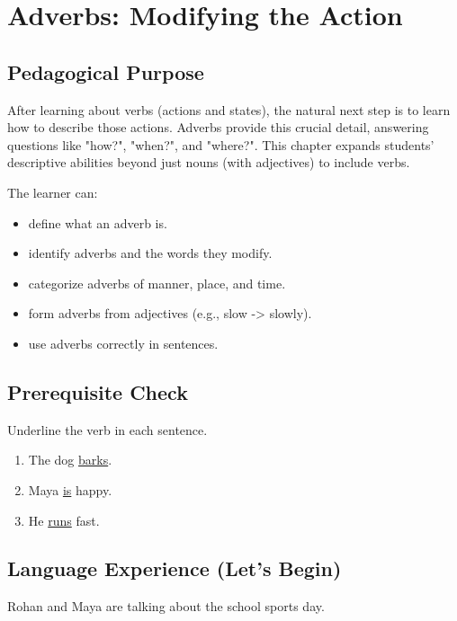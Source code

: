 
\chapter{Adverbs: Modifying the Action}

\section{Pedagogical Purpose}
After learning about verbs (actions and states), the natural next step is to learn how to describe those actions. Adverbs provide this crucial detail, answering questions like "how?", "when?", and "where?". This chapter expands students' descriptive abilities beyond just nouns (with adjectives) to include verbs.

\begin{learningobjectives}
The learner can:
\begin{itemize}
    \item define what an adverb is.
    \item identify adverbs and the words they modify.
    \item categorize adverbs of manner, place, and time.
    \item form adverbs from adjectives (e.g., slow -> slowly).
    \item use adverbs correctly in sentences.
\end{itemize}
\end{learningobjectives}

\section{Prerequisite Check}
\begin{quickcheck}
Underline the verb in each sentence.
\begin{enumerate}
    \item The dog \underline{barks}.
    \item Maya \underline{is} happy.
    \item He \underline{runs} fast.
\end{enumerate}
\end{quickcheck}

\section{Language Experience (Let's Begin)}
Rohan and Maya are talking about the school sports day.

